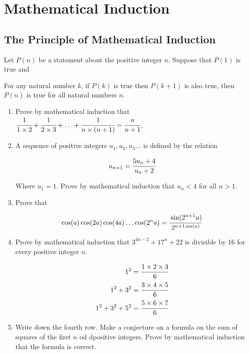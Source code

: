 \documentclass[letterpaper]{article}
\begin{document}
\section{Mathematical Induction}

\subsection{The Principle of Mathematical Induction}

Let $P(n)$ be a statement about the positive integer $n$. Suppose that $P(1)$ is true and 

For any natural number $k$, if $P(k)$ is true then $P(k+1)$ is also true, then $P(n)$ is true for all natural numbers $n$.

\begin{enumerate}
\item Prove by mathematical induction that $\cfrac{1}{1 \times 2} + \cfrac{1}{2 \times 3} + \ldots + \cfrac{1}{n \times (n + 1)} = \cfrac{n}{n + 1}$.

\item A sequence of positive integers $u_1, u_2, u_3 \ldots$ is defined by the relation

\begin{align*}
u_{n+1} = \cfrac{5u_n + 4}{u_n + 2}
\end{align*}

Where $u_1 = 1$. Prove by mathematical induction that $u_n < 4$ for all $n > 1$.

\item Prove that

\begin{align*}
\cos(a) \cos(2a) \cos(4a) \ldots \cos(2^n a) = \cfrac{\sin(2^{n+1} a)}{2^{n+1 \sin(a)}}
\end{align*}

\item Prove by mathematical induction that $3^{4n-2} + 17^n + 22$ is divisible by 16 for every positive integer $n$.

\begin{align*}
1^2 &= \cfrac{1 \times 2 \times 3}{6} \\
1^2 + 3^2 &= \cfrac{3 \times 4 \times 5}{6} \\
1^2 + 3^2 + 5^2 &= \cfrac{5 \times 6 \times 7}{6}
\end{align*}

\item Write down the fourth row. Make a conjecture on a formula on the sum of squares of the first $n$ od dpositive integers. Prove by mathematical induction that the formula is correct.


\end{enumerate}
\end{document}
